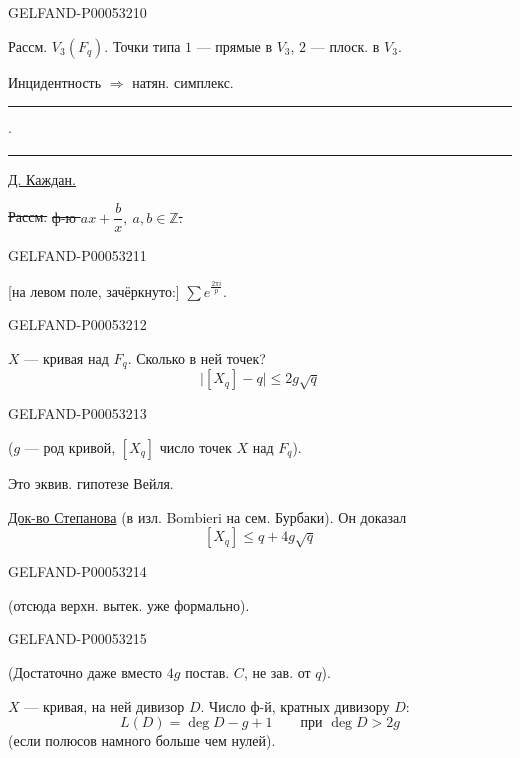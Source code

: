 \begin{GelfandAdjacentEvidence}{GELFAND-P000532}{10}


Рассм. \uline{\mbox{$V_3(F_q)$}}.
Точки типа $1$ — прямые в $V_3$, $2$ — плоск. в $V_3$.

Инцидентность $\Rightarrow$ натян. симплекс.

\hfill\rule{1.2cm}{.35pt}\enspace\(\cdot\)\enspace\rule{1.5cm}{.35pt}\par

\uline{Д. Каждан.}

\sout{Рассм.}\quad
\sout{ф-ю \mbox{$ax+\dfrac b x,\ a,b\in\mathbb Z$}.}
\end{GelfandAdjacentEvidence}
\begin{GelfandAdjacentEvidence}{GELFAND-P000532}{11}


[на левом поле, зачёркнуто:] \sout{\mbox{$\displaystyle\sum e^{\frac{2\pi i}{p}}$}}.
\end{GelfandAdjacentEvidence}
\begin{GelfandAdjacentEvidence}{GELFAND-P000532}{12}


$X$ — кривая над $F_q$. Сколько в ней точек?
\[
\bigl|[X_q]-q\bigr|\le 2g\sqrt q
\]
\end{GelfandAdjacentEvidence}
\begin{GelfandAdjacentEvidence}{GELFAND-P000532}{13}

($g$ — род кривой, $[X_q]$ число точек $X$ над $F_q$).

Это эквив. гипотезе Вейля.

\uline{Док-во Степанова} (в изл. Bombieri на сем. Бурбаки). Он доказал
\[
[X_q]\le q+4g\sqrt q
\]
\end{GelfandAdjacentEvidence}
\begin{GelfandAdjacentEvidence}{GELFAND-P000532}{14}

(отсюда верхн. вытек. уже формально).
\end{GelfandAdjacentEvidence}
\begin{GelfandAdjacentEvidence}{GELFAND-P000532}{15}


(Достаточно даже вместо $4g$ постав. $C$, не зав. от $q$).

$X$ — кривая, на ней дивизор $D$. Число ф-й, кратных дивизору $D$:
\[
L(D)=\deg D-g+1\qquad \text{при }\deg D>2g
\]
(если полюсов намного больше чем нулей).
\end{GelfandAdjacentEvidence}



